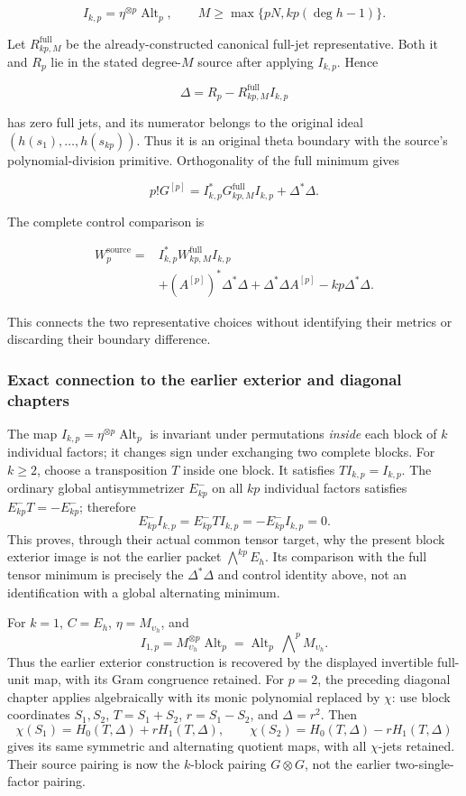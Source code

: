 \[
I_{k,p}=\eta^{\otimes p}\operatorname{Alt}_p,
\qquad M\geq\max\{pN,kp(\deg h-1)\}.
\]

Let \(R_{kp,M}^{\mathrm{full}}\) be the already-constructed canonical
full-jet representative. Both it and \(R_p\) lie in the stated
degree-\(M\) source after applying \(I_{k,p}\). Hence

\[
\Delta=R_p-R_{kp,M}^{\mathrm{full}}I_{k,p}
\]

has zero full jets, and its numerator belongs to the original ideal
\((h(s_1),\ldots,h(s_{kp}))\). Thus it is an original theta boundary
with the source's polynomial-division primitive. Orthogonality of the
full minimum gives

\[
\boxed{
p!G^{[p]}=I_{k,p}^*G_{kp,M}^{\mathrm{full}}I_{k,p}+\Delta^*\Delta.
}
\]

The complete control comparison is

\[
\begin{aligned}
W_p^{\mathrm{source}}={}&I_{k,p}^*W_{kp,M}^{\mathrm{full}}I_{k,p}\\
&+(A^{[p]})^*\Delta^*\Delta+\Delta^*\Delta A^{[p]}-kp\Delta^*\Delta.
\end{aligned}
\]

This connects the two representative choices without identifying their
metrics or discarding their boundary difference.

\subsubsection{Exact connection to the earlier exterior and diagonal chapters}
The map \(I_{k,p}=\eta^{\otimes p}\operatorname{Alt}_p\) is invariant
under permutations \emph{inside} each block of \(k\) individual factors;
it changes sign under exchanging two complete blocks.
For \(k\geq2\), choose a transposition \(T\) inside one block.
It satisfies \(TI_{k,p}=I_{k,p}\).
The ordinary global antisymmetrizer \(E^-_{kp}\) on all \(kp\)
individual factors satisfies \(E^-_{kp}T=-E^-_{kp}\); therefore
\[
E^-_{kp}I_{k,p}=E^-_{kp}TI_{k,p}
=-E^-_{kp}I_{k,p}=0 .
\]
This proves, through their actual common tensor target, why the present
block exterior image is not the earlier packet \(\bigwedge^{kp}E_h\).
Its comparison with the full tensor minimum is precisely the
\(\Delta^*\Delta\) and control identity above, not an identification
with a global alternating minimum.

For \(k=1\), \(C=E_h\), \(\eta=M_{\upsilon_h}\), and
\[
I_{1,p}=M_{\upsilon_h}^{\otimes p}\operatorname{Alt}_p
=\operatorname{Alt}_p\,\bigwedge\nolimits^pM_{\upsilon_h}.
\]
Thus the earlier exterior construction is recovered by the displayed
invertible full-unit map, with its Gram congruence retained.
For \(p=2\), the preceding diagonal chapter applies algebraically with
its monic polynomial replaced by \(\chi\): use block coordinates \(S_1,S_2\),
\(T=S_1+S_2\), \(r=S_1-S_2\), and \(\Delta=r^2\).
Then
\[
\chi(S_1)=H_0(T,\Delta)+rH_1(T,\Delta),\qquad
\chi(S_2)=H_0(T,\Delta)-rH_1(T,\Delta)
\]
gives its same symmetric and alternating quotient maps, with all
\(\chi\)-jets retained. Their source pairing is now the \(k\)-block
pairing \(G\otimes G\), not the earlier two-single-factor pairing.

